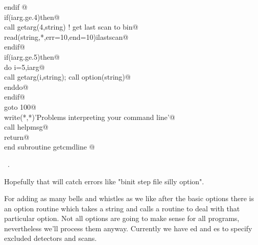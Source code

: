 \documentclass[10pt,a4paper,notitlepage]{article}
\begin{document}
\begin{flushleft}
\begin{minipage}{\linewidth}
\begin{list}{}{}
\mbox{}\verb@      endif   @\\
\mbox{}\verb@      if(iarg.ge.4)then@\\
\mbox{}\verb@        call getarg(4,string)   ! get last scan to bin@\\
\mbox{}\verb@        read(string,*,err=10,end=10)ilastscan@\\
\mbox{}\verb@      endif@\\
\mbox{}\verb@      if(iarg.ge.5)then@\\
\mbox{}\verb@        do i=5,iarg@\\
\mbox{}\verb@          call getarg(i,string); call option(string)@\\
\mbox{}\verb@        enddo@\\
\mbox{}\verb@      endif@\\
\mbox{}\verb@      goto 100@\\
\mbox{}    write(*,*)'Problems interpreting your command line'@\\
\mbox{}\verb@      call helpmsg@\\
\mbox{}   return@\\
\mbox{}\verb@      end subroutine getcmdline                                              @{\NWsep}
\end{list}
\vspace{-1.5ex}
\footnotesize
\begin{list}{}{\setlength{\itemsep}{-\parsep}\setlength{\itemindent}{-\leftmargin}}
\item \NWtxtMacroRefIn\ .

\item{}
\end{list}
\end{minipage}\vspace{4ex}
\end{flushleft}
Hopefully that will catch errors like "binit step file silly option".

For adding as many bells and whistles as we like after the basic options there
is an option routine which takes a string and calls a routine to deal
with that particular option. 
Not all options are going to make sense for all programs, nevertheless
we'll process them anyway.
Currently we have ed and es to specify excluded detectors and scans.
\end{document}
